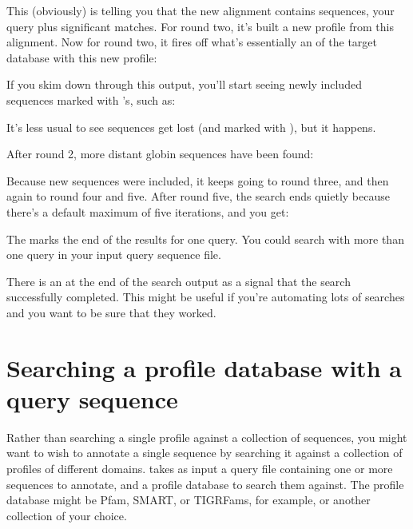 
This (obviously) is telling you that the new alignment contains \JHUninc{}
sequences, your query plus \JHUnsig{} significant matches. For round two,
it's built a new profile from this alignment. Now for round two, it
fires off what's essentially an  of the target
database with this new profile:


If you skim down through this output, you'll start seeing newly
included sequences marked with \mono{+}'s, such as:


It's less usual to see sequences get lost (and marked with \mono{-}),
but it happens.

After round 2, more distant globin sequences have been found:


Because new sequences were included, it keeps going to round three,
and then again to round four and five. After round five, the search
ends quietly because there's a default maximum of five iterations, and
you get:


The \mono{//} marks the end of the results for one query. You could
search with more than one query in your input query sequence
file. 

There is an \mono{[ok]} at the end of the search output as a signal
that the search successfully completed. This might be useful if you're
automating lots of searches and you want to be sure that they worked.



\section{Searching a profile database with a query sequence}

Rather than searching a single profile against a collection of
sequences, you might want to wish to annotate a single sequence by
searching it against a collection of profiles of different domains.
 takes as input a query file containing one or more
sequences to annotate, and a profile database to search them against.
The profile database might be Pfam, SMART, or TIGRFams, for example, or
another collection of your choice. 

